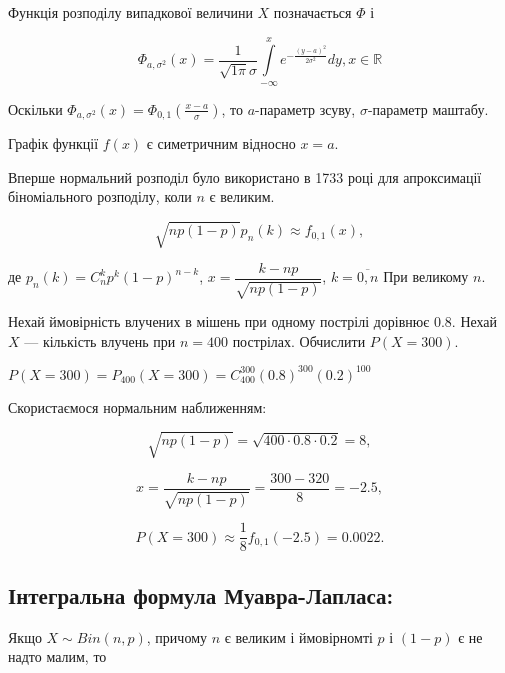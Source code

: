 Функція розподілу випадкової величини $X$ позначається $\Phi$ і

\begin{equation}
    \Phi_{a, \sigma^2}(x)
    = \frac{1}{\sqrt{1\pi} \sigma} \int\limits_{-\infty}^{x} e^{-\frac{(y-a)^2}{2\sigma^2}} dy,
    x \in \mathbb{R}
\end{equation}

Оскільки $\Phi_{a, \sigma^2}(x) = \Phi_{0, 1}(\frac{x-a}{\sigma})$,
то $a$-параметр зсуву, $\sigma$-параметр маштабу.

Графік функції $f(x)$ є симетричним відносно $x = a$.

\beautifulImage

Вперше нормальний розподіл було використано в 1733 році для
апроксимації біноміального розподілу, коли $n$ є великим.

\begin{theorem}
    \begin{equation}
        \sqrt{n p (1-p)} p_n(k) \approx f_{0, 1}(x),
    \end{equation}

    де $p_n(k) = C_n^kp^k(1-p)^{n-k}$,
    $x = \dfrac{k-np}{\sqrt{n p (1-p)}}$,
    $k = \overline{0, n}$
    При великому $n$.
\end{theorem}

\begin{example}
    Нехай ймовірність влучених в мішень при одному пострілі дорівнює 0.8.
    Нехай $X$ --- кількість влучень при $n = 400$ пострілах. Обчислити
    $P(X = 300)$.

    $P(X = 300)
    = P_{400}(X = 300)
    = C_{400}^{300} (0.8)^{300} (0.2)^{100}$
    
    Скористаємося нормальним наближенням:
    
    $$\sqrt{n p (1-p)} = \sqrt{400 \cdot 0.8 \cdot 0.2} = 8,$$
    
    $$x = \dfrac{k-np}{\sqrt{n p (1-p)}} = \dfrac{300-320}{8} = - 2.5,$$
    
    $$P(X = 300) \approx \frac{1}{8} f_{0,1}(-2.5) = 0.0022.$$
\end{example}
    
\subsection*{Інтегральна формула Муавра-Лапласа:}

Якщо $X \sim Bin(n, p)$, причому $n$ є великим і ймовірномті $p$
і $(1-p)$ є не надто малим, то

